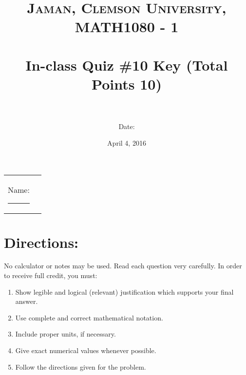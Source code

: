 \documentclass[paper=a4, fontsize=11pt]{scrartcl} %
\title{	
\normalfont \normalsize 
\textsc{Jaman, Clemson University, MATH1080 - 1} \\ [25pt] %
\horrule{0.5pt} \\[0.4cm] %
\huge In-class Quiz \#10 Key (Total Points 10) \\ %
\horrule{2pt} \\[0.5cm] %
}
\author{Date:} %
\date{\normalsize April 4, 2016} %
\numberwithin{equation}{section} %
\numberwithin{figure}{section} %
\numberwithin{table}{section} %
\begin{document}
\maketitle %

\begin{flushleft}
\begin{tabular}{l l}
Name: \rule{3.2in}{.01cm}  & {}%
\end{tabular}
\end{flushleft}


\section*{\textbf{Directions:}}

No calculator or notes may be used.  Read each question very carefully.  In order to receive full credit, you must:
\begin{enumerate}
\item Show legible and logical (relevant) justification which supports your final answer.
\item Use complete and correct mathematical notation.
\item Include proper units, if necessary.
\item Give exact numerical values whenever possible.
\item Follow the directions given for the problem.
\end{enumerate}
\vspace{.1in}

\newpage
\end{document}
